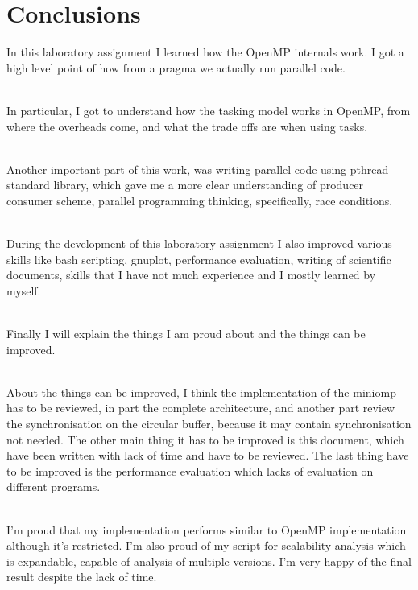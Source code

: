 \section{Conclusions}

In this laboratory assignment I learned how the OpenMP internals work. I got a high level point of how from a pragma we actually run parallel code.

\par ~\\
In particular, I got to understand how the tasking model works in OpenMP, from where the overheads come, and what the trade offs are when using tasks.

\par ~\\
Another important part of this work, was writing parallel code using pthread standard library, which gave me a more clear understanding of producer consumer scheme, parallel programming thinking, specifically, race conditions.

\par ~\\
During the development of this laboratory assignment I also improved various skills like bash scripting, gnuplot, performance evaluation, writing of scientific documents, skills that I have not much experience and I mostly learned by myself.

\par ~\\
Finally I will explain the things I am proud about and the things can be improved.

\par ~\\
About the things can be improved, I think the implementation of the miniomp has to be reviewed, in part the complete architecture, and another part review the synchronisation on the circular buffer, because it may contain synchronisation not needed. The other main thing it has to be improved is this document, which have been written with lack of time and have to be reviewed. The last thing have to be improved is the performance evaluation which lacks of evaluation on different programs.
\par ~\\
I'm proud that my implementation performs similar to OpenMP implementation although it's restricted. I'm also proud of my script for scalability analysis which is expandable, capable of analysis of multiple versions. I'm very happy of the final result despite the lack of time.

